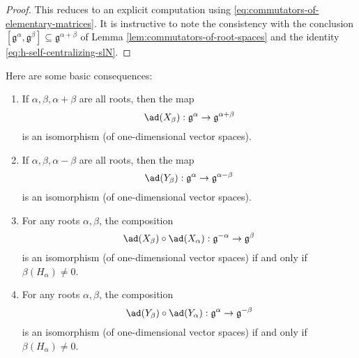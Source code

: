 \documentclass[reqno]{amsart} 
\begin{document}
\begin{proof}
  This reduces to an explicit computation using \eqref{eq:commutators-of-elementary-matrices}.  It is instructive to note the consistency with the conclusion $[\mathfrak{g}^\alpha, \mathfrak{g}^\beta] \subseteq \mathfrak{g}^{\alpha + \beta}$ of Lemma \ref{lem:commutators-of-root-spaces} and the identity \eqref{eq:h-self-centralizing-slN}.
\end{proof}

Here are some basic consequences:
\begin{lemma}\label{lem:compositions-of-ad-stuff}
  \begin{enumerate}
  \item If $\alpha,\beta,\alpha+\beta$ are all roots, then the map
    \begin{equation*}
      \ad(X_\beta) : \mathfrak{g}^\alpha \rightarrow \mathfrak{g}^{\alpha+\beta}
    \end{equation*}
    is an isomorphism (of one-dimensional vector spaces).
  \item If $\alpha,\beta,\alpha-\beta$ are all roots, then the map
    \begin{equation*}
      \ad(Y_\beta) : \mathfrak{g}^\alpha \rightarrow \mathfrak{g}^{\alpha-\beta}
    \end{equation*}
    is an isomorphism (of one-dimensional vector spaces).
  \item For any roots $\alpha,\beta$, the composition
    \begin{equation*}
      \ad(X_\beta) \circ \ad(X_\alpha) : \mathfrak{g}^{-\alpha} \rightarrow \mathfrak{g}^{\beta}
    \end{equation*}
    is an isomorphism (of one-dimensional vector spaces) if and only if $\beta(H_\alpha) \neq 0$.
  \item For any roots $\alpha,\beta$, the composition
    \begin{equation*}
      \ad(Y_\beta) \circ \ad(Y_\alpha) : \mathfrak{g}^{\alpha} \rightarrow \mathfrak{g}^{-\beta}
    \end{equation*}
    is an isomorphism (of one-dimensional vector spaces) if and only if $\beta(H_\alpha) \neq 0$.
  \end{enumerate}
\end{lemma}
\end{document}
